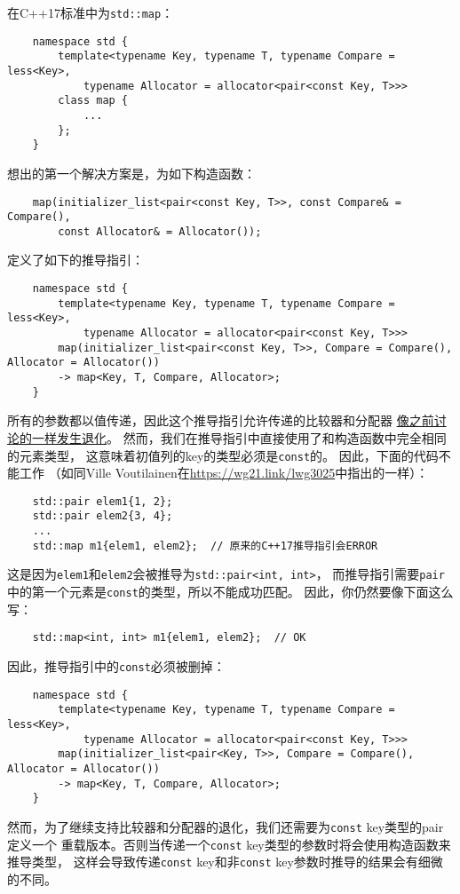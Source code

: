 在C++17标准中为\texttt{std::map}：
\begin{lstlisting}
    namespace std {
        template<typename Key, typename T, typename Compare = less<Key>,
            typename Allocator = allocator<pair<const Key, T>>>
        class map {
            ...
        };
    }
\end{lstlisting}
想出的第一个解决方案是，为如下构造函数：
\begin{lstlisting}
    map(initializer_list<pair<const Key, T>>, const Compare& = Compare(),
        const Allocator& = Allocator());
\end{lstlisting}
定义了如下的推导指引：
\begin{lstlisting}
    namespace std {
        template<typename Key, typename T, typename Compare = less<Key>,
            typename Allocator = allocator<pair<const Key, T>>>
        map(initializer_list<pair<const Key, T>>, Compare = Compare(), Allocator = Allocator())
        -> map<Key, T, Compare, Allocator>;
    }
\end{lstlisting}
所有的参数都以值传递，因此这个推导指引允许传递的比较器和分配器
\hyperref[ch9.2.1]{像之前讨论的一样发生退化}。
然而，我们在推导指引中直接使用了和构造函数中完全相同的元素类型，
这意味着初值列的key的类型必须是\texttt{const}的。
因此，下面的代码不能工作
（如同Ville Voutilainen在\url{https://wg21.link/lwg3025}中指出的一样）：
\begin{lstlisting}
    std::pair elem1{1, 2};
    std::pair elem2{3, 4};
    ...
    std::map m1{elem1, elem2};  // 原来的C++17推导指引会ERROR
\end{lstlisting}
这是因为\texttt{elem1}和\texttt{elem2}会被推导为\texttt{std::pair<int, int>}，
而推导指引需要\texttt{pair}中的第一个元素是\texttt{const}的类型，所以不能成功匹配。
因此，你仍然要像下面这么写：
\begin{lstlisting}
    std::map<int, int> m1{elem1, elem2};  // OK
\end{lstlisting}
因此，推导指引中的\texttt{const}必须被删掉：
\begin{lstlisting}
    namespace std {
        template<typename Key, typename T, typename Compare = less<Key>,
            typename Allocator = allocator<pair<const Key, T>>>
        map(initializer_list<pair<Key, T>>, Compare = Compare(), Allocator = Allocator())
        -> map<Key, T, Compare, Allocator>;
    }
\end{lstlisting}
然而，为了继续支持比较器和分配器的退化，我们还需要为\texttt{const} key类型的pair定义一个
重载版本。否则当传递一个\texttt{const} key类型的参数时将会使用构造函数来推导类型，
这样会导致传递\texttt{const} key和非\texttt{const} key参数时推导的结果会有细微的不同。

